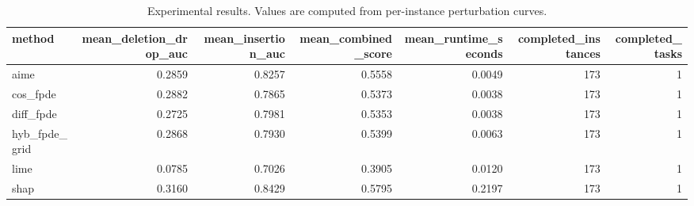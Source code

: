 \begin{table}[t]
\caption{Experimental results. Values are computed from per-instance perturbation curves.}
\label{tab:main_results_computed}
\centering
\begin{tabular}{lrrrrrr}
\toprule
method & mean\_deletion\_drop\_auc & mean\_insertion\_auc & mean\_combined\_score & mean\_runtime\_seconds & completed\_instances & completed\_tasks \\
\midrule
aime & 0.2859 & 0.8257 & 0.5558 & 0.0049 & 173 & 1 \\
cos\_fpde & 0.2882 & 0.7865 & 0.5373 & 0.0038 & 173 & 1 \\
diff\_fpde & 0.2725 & 0.7981 & 0.5353 & 0.0038 & 173 & 1 \\
hyb\_fpde\_grid & 0.2868 & 0.7930 & 0.5399 & 0.0063 & 173 & 1 \\
lime & 0.0785 & 0.7026 & 0.3905 & 0.0120 & 173 & 1 \\
shap & 0.3160 & 0.8429 & 0.5795 & 0.2197 & 173 & 1 \\
\bottomrule
\end{tabular}

\end{table}
